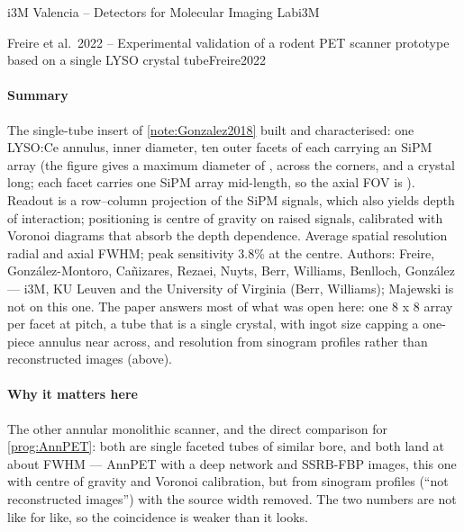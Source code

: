 \begin{programnote}{i3M Valencia -- Detectors for Molecular Imaging Lab}{i3M}
\begin{papernote}{Freire et al.\ 2022 -- Experimental validation of a rodent PET scanner prototype based on a single LYSO crystal tube}{Freire2022}
\paragraph{Summary}
The single-tube insert of \ref{note:Gonzalez2018} built and characterised:
one LYSO:Ce annulus,  inner diameter, ten outer facets of
 each carrying an SiPM array (the figure
gives a maximum diameter of , across the corners, and a crystal  long;
each facet carries one SiPM array mid-length, so the axial FOV is ). Readout is a
row--column projection of the SiPM signals, which also yields depth of
interaction; positioning is centre of gravity on raised signals, calibrated
with Voronoi diagrams that absorb the depth dependence. Average spatial
resolution  radial and  axial FWHM; peak
sensitivity 3.8\% at the centre. Authors: Freire, González-Montoro,
Cañizares, Rezaei, Nuyts, Berr, Williams, Benlloch, González --- i3M, KU
Leuven and the University of Virginia (Berr, Williams); Majewski is not on
this one.
The paper answers most of what was open here: one 8 x 8 array per facet at
 pitch, a tube that is a single crystal, with
ingot size capping a one-piece annulus near  across, and resolution
from sinogram profiles rather than reconstructed images (above).

\paragraph{Why it matters here}
The other annular monolithic scanner, and the direct comparison for
\ref{prog:AnnPET}: both are single faceted tubes of similar bore, and both
land at about  FWHM --- AnnPET with a deep network and SSRB-FBP
images, this one with centre of gravity and Voronoi calibration, but from
sinogram profiles (``not reconstructed images'') with the source width removed.
The two numbers are not like for like, so the coincidence is weaker than it
looks.


\end{papernote}
\end{programnote}
